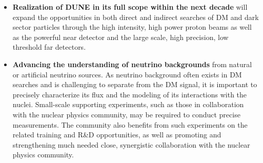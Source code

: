 \documentclass[nofootinbib]{article}
\begin{document}
\begin{itemize}
\item {\bf Realization of DUNE in its full scope within the next decade} will expand the opportunities in both direct and indirect searches of DM and dark sector particles through the high intensity, high power proton beams as well as the powerful near detector and the large scale, high precision, low threshold far detectors.
\item {\bf Advancing the understanding of neutrino backgrounds} from natural or artificial neutrino sources.  As neutrino background often exists in DM searches and is challenging to separate from the DM signal, it is important to precisely characterize its flux and the modeling of its interactions with the nuclei.  Small-scale supporting experiments, such as those in collaboration with the nuclear physics community, may be required to conduct precise measurements.  The community also benefits from such experiments on the related training and R\&D opportunities, as well as promoting and strengthening much needed close, synergistic collaboration with the nuclear physics community.
\end{itemize}
\end{document}
